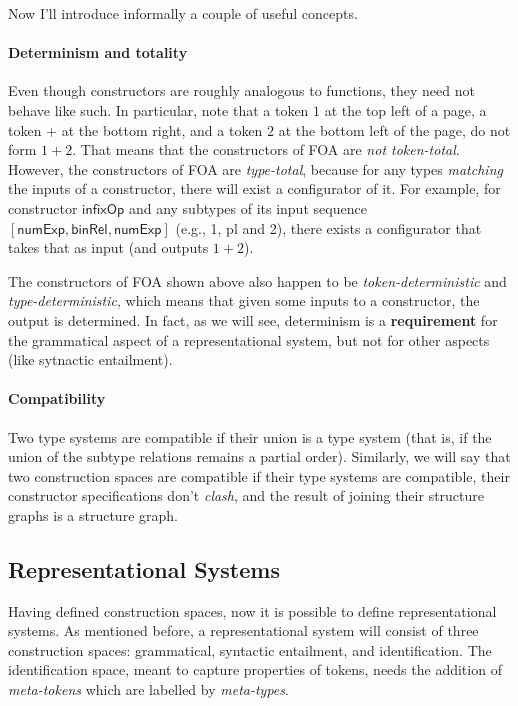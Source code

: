 \documentclass[a4paper]{article}
\theoremstyle{definition}
\begin{document}
	Now I'll introduce informally a couple of useful concepts.
		\paragraph{Determinism and totality}
		Even though constructors are roughly analogous to functions, they need not behave like such. In particular, note that a token $1$ at the top left of a page, a token $+$ at the bottom right, and a token $2$ at the bottom left of the page, do not form $1+2$. That means that the constructors of FOA are \textit{not token-total}. However, the constructors of FOA are \textit{type-total}, because for any types \textit{matching} the inputs of a constructor, there will exist a configurator of it. For example, for constructor $\textsf{infixOp}$ and any subtypes of its input sequence $[\textsf{numExp},\textsf{binRel},\textsf{numExp}]$ (e.g., \textsf{1}, \textsf{pl} and \textsf{2}), there exists a configurator that takes that as input (and outputs $1+2$).
		
		The constructors of FOA shown above also happen to be \textit{token-deterministic} and \textit{type-deterministic}, which means that given some inputs to a constructor, the output is determined. In fact, as we will see, determinism is a \textbf{requirement} for the {grammatical} aspect of a representational system, but not for other aspects (like {sytnactic entailment}).
		
		\paragraph{Compatibility}
		Two type systems are compatible if their union is a type system (that is, if the union of the subtype relations remains a partial order). Similarly, we will say that two construction spaces are compatible if their type systems are compatible, their constructor specifications don't \textit{clash}, and the result of joining their structure graphs is a structure graph. 
		
	\subsection{Representational Systems}
	Having defined construction spaces, now it is possible to define representational systems. As mentioned before, a representational system will consist of three construction spaces: grammatical, syntactic entailment, and identification. The identification space, meant to capture properties of tokens, needs the addition of \textit{meta-tokens} which are labelled by \textit{meta-types}.
		
\end{document}
